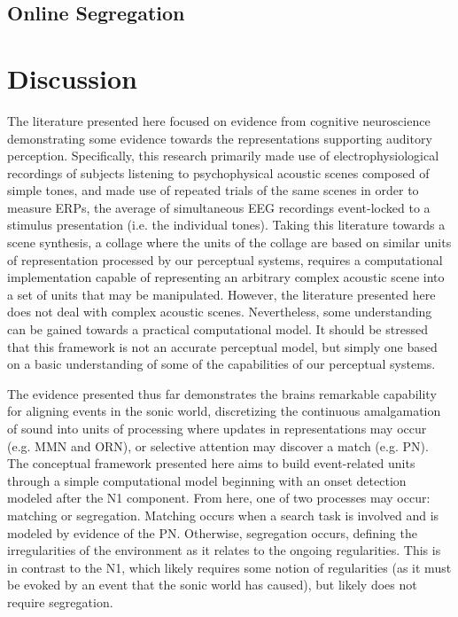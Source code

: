 \documentclass[a4paper,10pt,final]{ThesisStyle}
\begin{document}
\subsection{Online Segregation}



\section{Discussion}

The literature presented here focused on evidence from cognitive neuroscience demonstrating some evidence towards the representations supporting auditory perception.  Specifically, this research primarily made use of electrophysiological recordings of subjects listening to psychophysical acoustic scenes composed of simple tones, and made use of repeated trials of the same scenes in order to measure ERPs, the average of simultaneous EEG recordings event-locked to a stimulus presentation (i.e. the individual tones).  Taking this literature towards a scene synthesis, a collage where the units of the collage are based on similar units of representation processed by our perceptual systems, requires a computational implementation capable of representing an arbitrary complex acoustic scene into a set of units that may be manipulated.  However, the literature presented here does not deal with complex acoustic scenes.  Nevertheless, some understanding can be gained towards a practical computational model.  It should be stressed that this framework is not an accurate perceptual model, but simply one based on a basic understanding of some of the capabilities of our perceptual systems. 

The evidence presented thus far demonstrates the brains remarkable capability for aligning events in the sonic world, discretizing the continuous amalgamation of sound into units of processing where updates in representations may occur (e.g. MMN and ORN), or selective attention may discover a match (e.g. PN).  The conceptual framework presented here aims to build event-related units through a simple computational model beginning with an onset detection modeled after the N1 component.  From here, one of two processes may occur: matching or segregation.  Matching occurs when a search task is involved and is modeled by evidence of the PN.  Otherwise, segregation occurs, defining the irregularities of the environment as it relates to the ongoing regularities.  This is in contrast to the N1, which likely requires some notion of regularities (as it must be evoked by an event that the sonic world has caused), but likely does not require segregation.
\end{document}
